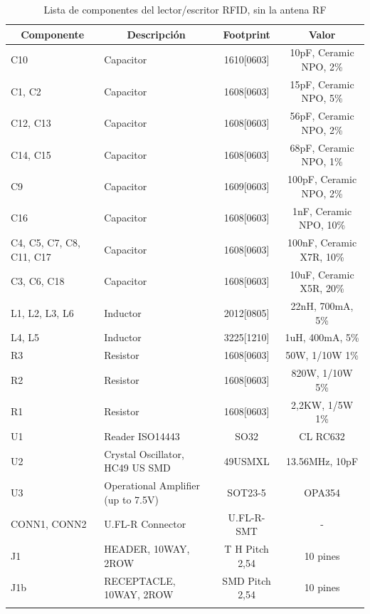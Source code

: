 \begin{longtable}{|l|p{3cm}|c|c|}
\hline
\multicolumn{1}{|c|}{\textbf{Componente}} & \multicolumn{1}{c|}{\textbf{Descripción}} & \textbf{ Footprint} & \textbf{Valor} \\ \hline
C10 & Capacitor & 1610[0603] & 10pF, Ceramic NPO, 2\% \\ \hline
C1, C2 & Capacitor & 1608[0603] & 15pF, Ceramic NPO, 5\% \\ \hline
C12, C13 & Capacitor & 1608[0603] & 56pF, Ceramic NPO, 2\% \\ \hline
C14, C15 & Capacitor & 1608[0603] & 68pF, Ceramic NPO, 1\% \\ \hline
C9 & Capacitor & 1609[0603] & 100pF, Ceramic NPO,  2\% \\ \hline
C16 & Capacitor & 1608[0603] & 1nF, Ceramic NPO, 10\% \\ \hline
C4, C5, C7, C8, C11, C17 & Capacitor & 1608[0603] & 100nF, Ceramic X7R, 10\% \\ \hline
C3, C6, C18 & Capacitor & 1608[0603] & 10uF, Ceramic X5R, 20\% \\ \hline
L1, L2, L3, L6 & Inductor & 2012[0805] & 22nH, 700mA, 5\% \\ \hline
L4, L5 & Inductor & 3225[1210] & 1uH, 400mA, 5\% \\ \hline
R3 & Resistor & 1608[0603] & 50W, 1/10W   1\% \\ \hline
R2 & Resistor & 1608[0603] & 820W, 1/10W   5\% \\ \hline
R1 & Resistor & 1608[0603] & 2,2KW, 1/5W   1\% \\ \hline
U1 & Reader ISO14443 & SO32 & CL RC632 \\ \hline
U2 & Crystal Oscillator, HC49 US SMD & 49USMXL & 13.56MHz, 10pF \\ \hline
U3 & Operational Amplifier (up to 7.5V) & SOT23-5 & OPA354 \\ \hline
CONN1, CONN2 & U.FL-R Connector & U.FL-R-SMT & - \\ \hline
J1 & HEADER, 10WAY, 2ROW & T H Pitch 2,54 & 10 pines \\ \hline
J1b & RECEPTACLE, 10WAY, 2ROW & SMD  Pitch 2,54 & 10 pines \\ \hline
\caption{Lista de componentes del lector/escritor RFID, sin la antena RF}
\label{}
\end{longtable}

